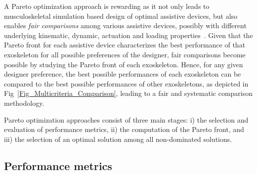 \documentclass[10pt,letterpaper]{article}
\begin{document}
A Pareto optimization approach is rewarding as it not only leads to musculoskeletal simulation based design of optimal assistive devices, but also enables \emph{fair comparisons}  among various assistive devices, possibly with different underlying kinematic, dynamic, actuation and loading properties~\cite{Unal2008,Kamadan2017,Yusuf2020}.  Given that the Pareto front for each assistive device characterizes the best performance of that exoskeleton for all possible preferences of the designer, fair comparisons become possible by studying the Pareto front of each exoskeleton. Hence, for any given designer preference, the best possible performances of each exoskeleton can be compared to the best possible performances of other exoskeletons, as depicted in Fig~\ref{Fig_Multicriteria_Comparison}, leading to a fair and systematic comparison methodology.

Pareto optimization approaches consist of three main stages: i) the selection and evaluation of performance metrics, ii) the computation of the Pareto front, and iii) the selection of an optimal solution among all non-dominated solutions.

%
%

\subsection*{Performance metrics}
\end{document}
